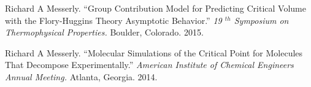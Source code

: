 \documentclass[12pt]{article}
\begin{document}
\begin{etaremune}
\item Richard A Messerly. ``Group Contribution Model for Predicting Critical Volume with the Flory-Huggins Theory Asymptotic Behavior.'' \textit{19 $^{th}$ Symposium on Thermophysical Properties.} Boulder, Colorado. 2015.

\item Richard A Messerly. ``Molecular Simulations of the Critical Point for Molecules That Decompose Experimentally.'' \textit{American Institute of Chemical Engineers Annual Meeting.} Atlanta, Georgia. 2014.

\end{etaremune}
\end{document}
